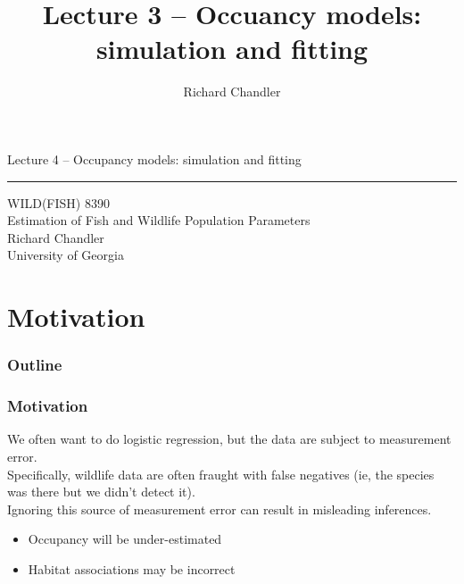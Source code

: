 \documentclass[color=usenames,dvipsnames]{beamer}\usepackage[]{graphicx}\usepackage[]{color}
\title{Lecture 3 -- Occuancy models: simulation and fitting }
\author{Richard Chandler}
\begin{document}
\begin{frame}[plain]
  \LARGE
  \centering
  {\huge Lecture 4 -- Occupancy models: simulation and fitting} \\
  {\color{default} \rule{\textwidth}{0.1pt}}
  \vfill
  \large
  WILD(FISH) 8390 \\
  Estimation of Fish and Wildlife Population Parameters \\
  \vfill
  \large
  Richard Chandler \\
  University of Georgia \\
\end{frame}






\section{Motivation}



\begin{frame}[plain]
  \frametitle{Outline}
  \Large
\end{frame}



\begin{frame}
  \frametitle{Motivation}
  We often want to do logistic regression, but the data are subject
  to measurement error. \\  
  \pause
  \vfill
  Specifically, wildlife data are often fraught with false negatives
  (ie, the species was there but we didn't detect it). \\
  \pause
  \vfill
  Ignoring this source of measurement error can result in misleading
  inferences. \\
  \begin{itemize}
    \item Occupancy will be under-estimated
    \item Habitat associations may be incorrect
  \end{itemize}
\end{frame}


\end{document}
